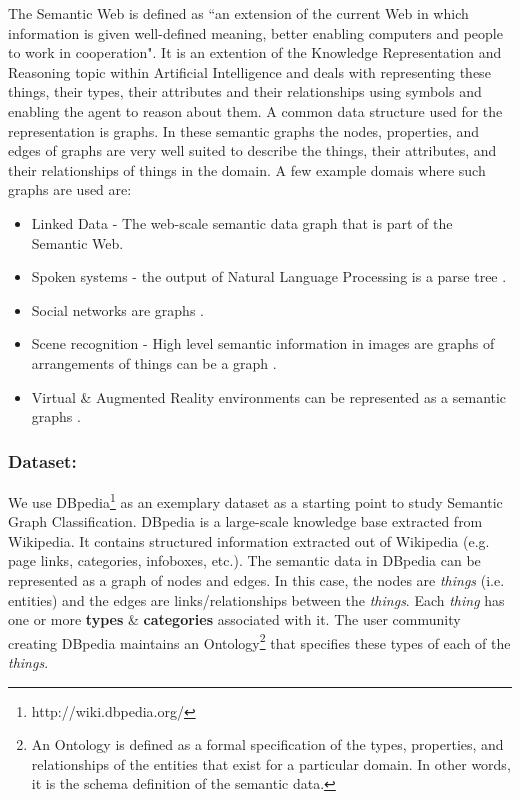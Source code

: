 \documentclass[runningheads,a4paper]{llncs}
\begin{document}
The Semantic Web is defined as ``an extension of the current Web in which
information is given well-defined meaning, better enabling computers and people to
work in cooperation"\cite{berners2001semantic}. 
It is an extention of the Knowledge Representation and Reasoning topic within Artificial Intelligence 
and deals with representing these things, their types, their attributes and their relationships
using symbols and enabling the agent to reason about them. 
A common data structure used for the representation is graphs. In these semantic graphs the nodes,
properties, and edges of graphs are very well suited to describe the things, their attributes,
and their relationships of things in the domain. A few example domais where such graphs are used are:
\begin{itemize}
\item Linked Data - The web-scale semantic data graph that is part of the Semantic Web\cite{heath2011linked}.
\item Spoken systems - the output of Natural Language Processing is a parse
tree \cite{socher2011parsing}.
\item Social networks are graphs \cite{backstrom2011supervised}.
\item Scene recognition - High level semantic information in images are graphs of arrangements of
things can be a graph \cite{socher2011parsing}.
\item Virtual \& Augmented Reality environments can be represented as a semantic graphs \cite{lugrin2007making}.
\end{itemize}

\subsubsection{Dataset:}
We use DBpedia\footnote{http://wiki.dbpedia.org/} as an exemplary dataset 
as a starting point to study Semantic Graph Classification. DBpedia is a 
large-scale knowledge base extracted from Wikipedia\cite{lehmann2015dbpedia}. 
It contains structured information extracted 
out of Wikipedia (e.g. page links, categories, infoboxes, etc.)\cite{dbpedia-swj}.
The semantic data in DBpedia can be represented as a graph of nodes and edges.
In this case, the nodes are \textit{things} (i.e. entities) and the edges are links/relationships between the
\textit{things}. Each \textit{thing} has one or more \textbf{types} \& \textbf{categories} associated with it.
The user community creating DBpedia maintains an Ontology\footnote{An Ontology is defined as a formal specification of the types, properties, and relationships of the entities that exist for a particular domain. In other words, it is the schema definition of the semantic data.} that specifies these types
of each of the \textit{things}. 
\end{document}
